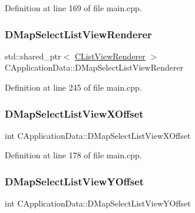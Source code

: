 Definition at line 169 of file main.\+cpp.

\hypertarget{classCApplicationData_a5e5746ba44c03038d1a392872614de14}{}\label{classCApplicationData_a5e5746ba44c03038d1a392872614de14} 
\subsubsection{\texorpdfstring{D\+Map\+Select\+List\+View\+Renderer}{DMapSelectListViewRenderer}}
{\footnotesize\ttfamily std\+::shared\+\_\+ptr$<$ \hyperlink{classCListViewRenderer}{C\+List\+View\+Renderer} $>$ C\+Application\+Data\+::\+D\+Map\+Select\+List\+View\+Renderer\hspace{0.3cm}{\ttfamily [protected]}}



Definition at line 245 of file main.\+cpp.

\hypertarget{classCApplicationData_aa5a89b442e384acdf1c2aefc7ce4233b}{}\label{classCApplicationData_aa5a89b442e384acdf1c2aefc7ce4233b} 
\subsubsection{\texorpdfstring{D\+Map\+Select\+List\+View\+X\+Offset}{DMapSelectListViewXOffset}}
{\footnotesize\ttfamily int C\+Application\+Data\+::\+D\+Map\+Select\+List\+View\+X\+Offset\hspace{0.3cm}{\ttfamily [protected]}}



Definition at line 178 of file main.\+cpp.

\hypertarget{classCApplicationData_ae1a8eb3fff3cf5bc236564925bec1c8c}{}\label{classCApplicationData_ae1a8eb3fff3cf5bc236564925bec1c8c} 
\subsubsection{\texorpdfstring{D\+Map\+Select\+List\+View\+Y\+Offset}{DMapSelectListViewYOffset}}
{\footnotesize\ttfamily int C\+Application\+Data\+::\+D\+Map\+Select\+List\+View\+Y\+Offset\hspace{0.3cm}{\ttfamily [protected]}}




